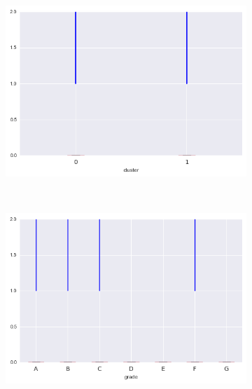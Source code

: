 \begin{apendicesenv}
\begin{figure}[t!]
\begin{subfigure}[t]{0.5\textwidth}
			\centerline{\includegraphics[width=1.05\textwidth]{img/pub_rec_by_cluster}}
    	\end{subfigure}%
    	~ 
    	\begin{subfigure}[t]{0.5\textwidth}
    		\centering
   
			\centerline{\includegraphics[width=1.05\textwidth]{img/pub_rec_by_grade}}

    	\end{subfigure}
\\
    	        \caption{inq\textunderscore last\textunderscore 6mths}
    	\begin{subfigure}[t]{0.5\textwidth}
    		\centering


\end{subfigure}
\end{figure}
\end{apendicesenv}
